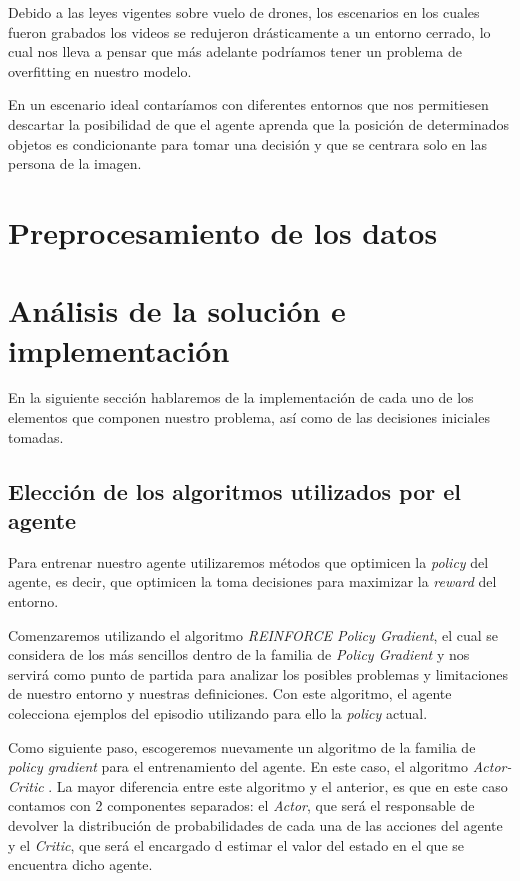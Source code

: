 Debido a las leyes vigentes sobre vuelo de drones, los escenarios en los cuales fueron grabados los videos se redujeron drásticamente a un entorno cerrado, lo cual nos lleva a pensar que más adelante podríamos tener un problema de overfitting en nuestro modelo.
\medskip

En un escenario ideal contaríamos con diferentes entornos que nos permitiesen descartar la posibilidad de que el agente aprenda que la posición de determinados objetos es condicionante para tomar una decisión y que se centrara solo en las persona de la imagen.
\medskip

\section{Preprocesamiento de los datos}
\label{preprocesamiento-datos}


\clearpage
\section{Análisis de la solución e implementación}
\label{analisis-de-la-solucion-e-implementacion}

En la siguiente sección hablaremos de la implementación de cada uno de los elementos que componen nuestro problema, así como de las decisiones iniciales tomadas.
\medskip

\subsection{Elección de los algoritmos utilizados por el agente}
\label{eleccion-de-algoritmos}

Para entrenar nuestro agente utilizaremos métodos que optimicen la \textit{policy} del agente, es decir, que optimicen la toma decisiones para maximizar la \textit{reward} del entorno.
\medskip

Comenzaremos utilizando el algoritmo \textit{REINFORCE Policy Gradient}, el cual se considera de los más sencillos dentro de la familia de \textit{Policy Gradient} y nos servirá como punto de partida para analizar los posibles problemas y limitaciones de nuestro entorno y nuestras definiciones. Con este algoritmo, el agente colecciona ejemplos del episodio utilizando para ello la \textit{policy} actual.
\medskip



Como siguiente paso, escogeremos nuevamente un algoritmo de la familia de \textit{policy gradient} para el entrenamiento del agente. En este caso, el algoritmo \textit{Actor-Critic} \citep{DBLP:journals/corr/abs-1801-01290}. La mayor diferencia entre este algoritmo y el anterior, es que en este caso contamos con 2 componentes separados: el \textit{Actor}, que será el responsable de devolver la distribución de probabilidades de cada una de las acciones del agente y el \textit{Critic}, que será el encargado d estimar el valor del estado en el que se encuentra dicho agente.
\medskip

